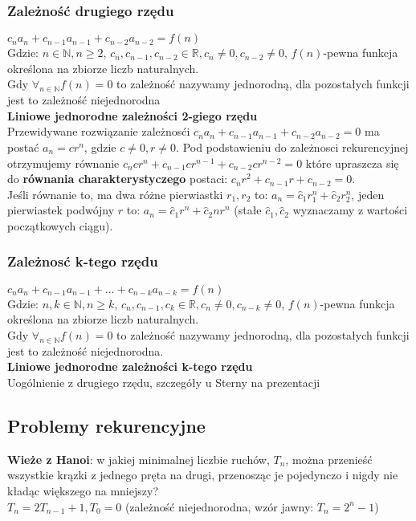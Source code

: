 \documentclass[a4paper,12pt]{article}
\begin{document}
\subsubsection{Zależność drugiego rzędu}
$c_na_n+c_{n-1}a_{n-1}+c_{n-2}a_{n-2}=f(n)$\\
Gdzie: $n\in\mathbb{N}, n\geq2$, $c_n,c_{n-1}, c_{n-2}\in\mathbb{R}, c_n\neq0, c_{n-2}\neq0$, $f(n)$-pewna funkcja określona na zbiorze liczb naturalnych.\\
Gdy $\forall_{n \in\mathbb{N}}f(n)=0$ to zależność nazywamy jednorodną, dla pozostałych funkcji  jest to zależność niejednorodna \\
\textbf{Liniowe jednorodne zależności 2-giego rzędu}\\
Przewidywane rozwiązanie zależnosći $c_na_n+c_{n-1}a_{n-1}+c_{n-2}a_{n-2}=0$ ma postać $a_n=cr^n$, gdzie $c\neq0, r\neq0$. Pod podstawieniu do zależnosci rekurencyjnej otrzymujemy równanie $c_ncr^n+c_{n-1}cr^{n-1}+c_{n-2}cr^{n-2}=0$ które upraszcza się do \textbf{równania charakterystyczego} postaci: $c_nr^2+c_{n-1}r+c_{n-2}=0$.\\
Jeśli równanie to, ma dwa różne pierwiastki $r_1, r_2$ to: $a_n=\hat c_1r_1^n+\hat c_2r_2^n$, jeden pierwiastek podwójny $r$ to: $a_n=\hat c_1r^n+\hat c_2nr^n$ (stałe $\hat c_1, \hat c_2$ wyznaczamy z wartości początkowych ciągu).
\subsubsection{Zależnosć k-tego rzędu}
$c_na_n+c_{n-1}a_{n-1}+\dots + c_{n-k}a_{n-k}=f(n)$\\
Gdzie: $n,k\in\mathbb{N}, n\geq k$, $c_n,c_{n-1}, c_k\in\mathbb{R}, c_n\neq0, c_{n-k}\neq0$, $f(n)$-pewna funkcja określona na zbiorze liczb naturalnych.\\
Gdy $\forall_{n \in\mathbb{N}}f(n)=0$ to zależność nazywamy jednorodną, dla pozostałych funkcji  jest to zależność niejednorodna. \\
\textbf{Liniowe jednorodne zależności k-tego rzędu}\\
Uogólnienie z drugiego rzędu, szczegóły u Sterny na prezentacji
\subsection{Problemy rekurencyjne}
\textbf{Wieże z Hanoi}: w jakiej minimalnej liczbie ruchów, $T_n$, można przenieść wszystkie krązki z jednego pręta na drugi, przenosząc je pojedynczo i nigdy nie kładąc większego na mniejszy?\\
$T_n=2T_{n-1}+1, T_0=0$ (zależność niejednorodna, wzór jawny: $T_n=2^n-1$)
\end{document}
